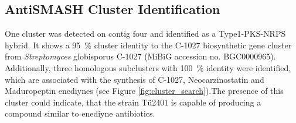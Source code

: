 
    \subsection{AntiSMASH Cluster Identification} %
    \label{sub:antismash_cluster_identification}

	 One cluster was detected on contig four and identified as a Type1-PKS-NRPS hybrid. It shows a 95~\% cluster identity to the C-1027 biosynthetic gene cluster from \textit{Streptomyces} globisporus C-1027 (MiBiG accession no. BGC0000965). Additionally, three homologous subclusters with 100~\% identity were identified, which are associated with the synthesis of C-1027, Neocarzinostatin and Maduropeptin enediynes (see Figure \ref{fig:cluster_search}).The presence of this cluster could indicate, that the strain Tü2401 is capable of producing a compound similar to enediyne antibiotics. 
	 
